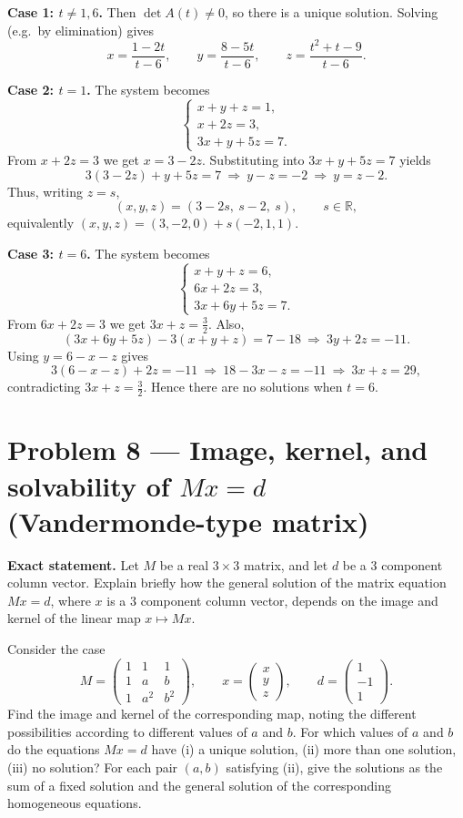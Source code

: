 \documentclass[12pt,a4paper]{article}
\theoremstyle{plain}
\theoremstyle{definition}      %
\begin{document}
\textbf{Case 1: \(t\neq 1,6\).}
Then \(\det A(t)\neq 0\), so there is a unique solution. Solving (e.g.\ by elimination) gives
\[
x=\frac{1-2t}{t-6},\qquad
y=\frac{8-5t}{t-6},\qquad
z=\frac{t^2+t-9}{t-6}.
\]

\textbf{Case 2: \(t=1\).}
The system becomes
\[
\begin{cases}
	x+y+z=1,\\
	x+2z=3,\\
	3x+y+5z=7.
\end{cases}
\]
From \(x+2z=3\) we get \(x=3-2z\). Substituting into \(3x+y+5z=7\) yields
\[
3(3-2z)+y+5z=7 \ \Rightarrow\ y-z=-2 \ \Rightarrow\ y=z-2.
\]
Thus, writing \(z=s\),
\[
(x,y,z)=(3-2s,\ s-2,\ s),\qquad s\in\mathbb R,
\]
equivalently \((x,y,z)=(3,-2,0)+s(-2,1,1)\).

\textbf{Case 3: \(t=6\).}
The system becomes
\[
\begin{cases}
	x+y+z=6,\\
	6x+2z=3,\\
	3x+6y+5z=7.
\end{cases}
\]
From \(6x+2z=3\) we get \(3x+z=\tfrac{3}{2}\).
Also,
\[
(3x+6y+5z)-3(x+y+z)=7-18 \ \Rightarrow\ 3y+2z=-11.
\]
Using \(y=6-x-z\) gives
\[
3(6-x-z)+2z=-11 \ \Rightarrow\ 18-3x-z=-11 \ \Rightarrow\ 3x+z=29,
\]
contradicting \(3x+z=\tfrac{3}{2}\). Hence there are no solutions when \(t=6\).


\section*{Problem 8 — Image, kernel, and solvability of \(Mx=d\) (Vandermonde-type matrix)}

\textbf{Exact statement.}
Let \(M\) be a real \(3\times 3\) matrix, and let \(d\) be a 3 component column vector. Explain briefly how the
general solution of the matrix equation \(Mx=d\), where \(x\) is a 3 component column vector, depends on
the image and kernel of the linear map \(x\mapsto Mx\).

Consider the case
\[
M=\begin{pmatrix}
	1&1&1\\
	1&a&b\\
	1&a^2&b^2
\end{pmatrix},\qquad
x=\begin{pmatrix}x\\y\\z\end{pmatrix},\qquad
d=\begin{pmatrix}1\\-1\\1\end{pmatrix}.
\]
Find the image and kernel of the corresponding map, noting the different possibilities according to different values of \(a\) and \(b\).
For which values of \(a\) and \(b\) do the equations \(Mx=d\) have (i) a unique solution, (ii) more than one solution, (iii) no solution?
For each pair \((a,b)\) satisfying (ii), give the solutions as the sum of a fixed solution and the general solution of the corresponding homogeneous equations.
\end{document}
